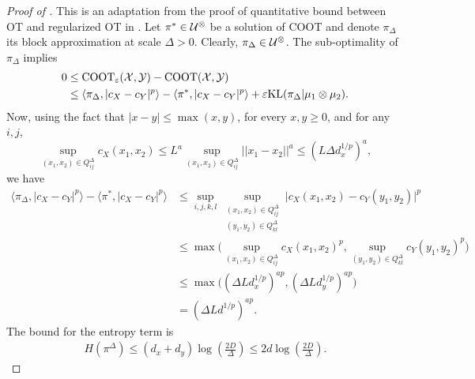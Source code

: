 \begin{proof}[Proof of ]
  This is an adaptation from the proof of quantitative bound between OT and regularized OT
  in \citep{Genevay19}.
  Let $\pi^* \in \mathcal U^{\otimes}$ be a solution of COOT and denote $\pi_{\Delta}$
  its block approximation at scale $\Delta > 0$.
  Clearly, $\pi_{\Delta} \in \mathcal U^{\otimes}$. The sub-optimality of $\pi_{\Delta}$ implies
  \begin{equation}
    \begin{split}
      0 &\leq \text{COOT}_{\varepsilon}(\mathcal X, \mathcal Y) - \text{COOT}(\mathcal X, \mathcal Y) \\
      &\leq \langle \pi_{\Delta}, \vert c_X - c_Y \vert^p \rangle
      - \langle \pi^*, \vert c_X - c_Y \vert^p \rangle +
      \varepsilon \text{KL}(\pi_{\Delta} \vert \mu_1 \otimes \mu_2).
    \end{split}
  \end{equation}
  Now, using the fact that $\vert x - y \vert \leq \max(x,y)$, for every $x, y \geq 0$,
  and for any $i,j$,
  \begin{equation}
    \sup_{(x_1, x_2) \in Q^{\Delta}_{ij}} c_X(x_1,x_2) \leq
    L^a \sup_{(x_1, x_2) \in Q^{\Delta}_{ij}} \vert\vert x_1 - x_2 \vert\vert^a \leq (L \Delta d_x^{1/p})^a,
  \end{equation}
  we have
  \begin{equation}
    \begin{split}
      \langle \pi_{\Delta}, \vert c_X - c_Y \vert^p \rangle
      - \langle \pi^*, \vert c_X - c_Y \vert^p \rangle
      &\leq \sup_{i,j,k,l} \sup_{\substack{(x_1, x_2) \in Q^{\Delta}_{ij} \\ (y_1,y_2) \in Q^{\Delta}_{kl}}}
      \vert c_X(x_1,x_2) - c_Y(y_1,y_2) \vert^p \\
      &\leq \max\big( \sup_{(x_1, x_2) \in Q^{\Delta}_{ij}} c_X(x_1,x_2)^p,
      \sup_{(y_1, y_2) \in Q^{\Delta}_{kl}} c_Y(y_1,y_2)^p \big) \\
      &\leq \max\big( (\Delta Ld_x^{1/p})^{ap}, (\Delta Ld_y^{1/p})^{ap} \big) \\
      &= (\Delta Ld^{1/p})^{ap}.
    \end{split}
  \end{equation}
  The bound for the entropy term is
  \begin{equation}
    \begin{split}
      H(\pi^{\Delta}) \leq (d_x + d_y) \log(\frac{2D}{\Delta}) \leq 2 d \log(\frac{2D}{\Delta}).
    \end{split}

\end{equation}
\end{proof}
